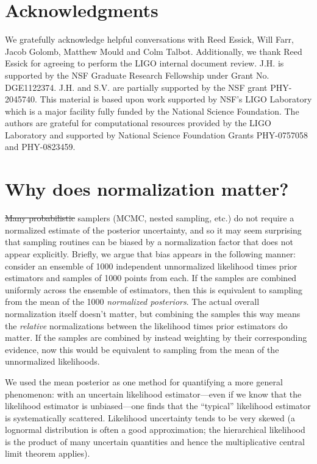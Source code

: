 \documentclass[%
 reprint,
 amsmath,amssymb,
 aps,nofootinbib,nobibnotes,onecolumn,prd
]{revtex4-2}
\providecommand{\DIFaddtex}[1]{{\protect\color{blue}\uwave{#1}}} %
\providecommand{\DIFdeltex}[1]{{\protect\color{red}\sout{#1}}}                      %
\providecommand{\DIFaddbegin}{} %
\providecommand{\DIFaddend}{} %
\providecommand{\DIFdelbegin}{} %
\providecommand{\DIFdelend}{} %
\providecommand{\DIFadd}[1]{\texorpdfstring{\DIFaddtex{#1}}{#1}} %
\providecommand{\DIFdel}[1]{\texorpdfstring{\DIFdeltex{#1}}{}} %
\newcommand{\DIFscaledelfig}{0.5}
\newlength{\DIFdelgraphicswidth} %
\newlength{\DIFdelgraphicsheight} %
\newcommand{\DIFaddincludegraphics}[2][]{{\color{blue}\fbox{\DIFOincludegraphics[#1]{#2}}}} %
\newcommand{\DIFdelincludegraphics}[2][]{%
\sbox{\DIFdelgraphicsbox}{\DIFOincludegraphics[#1]{#2}}%
\settoboxwidth{\DIFdelgraphicswidth}{\DIFdelgraphicsbox} %
\settoboxtotalheight{\DIFdelgraphicsheight}{\DIFdelgraphicsbox} %
\scalebox{\DIFscaledelfig}{%
\parbox[b]{\DIFdelgraphicswidth}{\usebox{\DIFdelgraphicsbox}\\[-\baselineskip] \rule{\DIFdelgraphicswidth}{0em}}\llap{\resizebox{\DIFdelgraphicswidth}{\DIFdelgraphicsheight}{%
\setlength{\unitlength}{\DIFdelgraphicswidth}%
\begin{picture}(1,1)%
\thicklines\linethickness{2pt} %
{\color[rgb]{1,0,0}\put(0,0){\framebox(1,1){}}}%
{\color[rgb]{1,0,0}\put(0,0){\line( 1,1){1}}}%
{\color[rgb]{1,0,0}\put(0,1){\line(1,-1){1}}}%
\end{picture}%
}\hspace*{3pt}}} %
} %
\DeclareRobustCommand{\DIFaddbegin}{\DIFOaddbegin \let\includegraphics\DIFaddincludegraphics} %
\DeclareRobustCommand{\DIFaddend}{\DIFOaddend \let\includegraphics\DIFOincludegraphics} %
\DeclareRobustCommand{\DIFdelbegin}{\DIFOdelbegin \let\includegraphics\DIFdelincludegraphics} %
\DeclareRobustCommand{\DIFdelend}{\DIFOaddend \let\includegraphics\DIFOincludegraphics} %
\begin{document}
\section{Acknowledgments}

We gratefully acknowledge helpful conversations with Reed Essick, Will Farr, Jacob Golomb, Matthew Mould and Colm Talbot. 
%
Additionally, we thank Reed Essick for agreeing to perform the LIGO internal document review.
%
J.H. is supported by the NSF Graduate Research Fellowship under Grant No. DGE1122374.
%
J.H. and S.V. are partially supported by the NSF grant PHY-2045740.
%
This material is based upon work supported by NSF's LIGO Laboratory which is a major facility fully funded by the National Science Foundation.
%
The authors are grateful for computational resources provided by the LIGO Laboratory and supported by National Science Foundation Grants PHY-0757058 and PHY-0823459.


\appendix

\section{Why does normalization matter?}
\label{app: normalization discussion}

\DIFdelbegin \DIFdel{Many probabilistic }\DIFdelend \DIFaddbegin \DIFadd{Probabilistic }\DIFaddend samplers (MCMC, nested sampling, etc.) do not require a normalized estimate of the posterior uncertainty, and so it may seem surprising that sampling routines can be biased by a normalization factor that does not appear explicitly. Briefly, we argue that bias appears in the following manner: consider an ensemble of 1000 independent unnormalized likelihood times prior estimators and samples of 1000 points from each. If the samples are combined uniformly across the ensemble of estimators, then this is equivalent to sampling from the mean of the 1000 \textit{normalized posteriors}. The actual overall normalization itself doesn’t matter, but combining the samples this way means the \textit{relative} normalizations between the likelihood times prior estimators do matter. If the samples are combined by instead weighting by their corresponding evidence, now this would be equivalent to sampling from the mean of the unnormalized likelihoods. 

We used the mean posterior as one method for quantifying a more general phenomenon: with an uncertain likelihood estimator---even if we know that the likelihood estimator is unbiased---one finds that the ``typical'' likelihood estimator is systematically scattered. Likelihood uncertainty tends to be very skewed (a lognormal distribution is often a good approximation; the hierarchical likelihood is the product of many uncertain quantities and hence the multiplicative central limit theorem applies).
\end{document}
